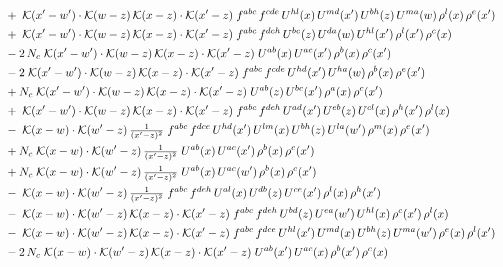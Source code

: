 \documentclass[10pt]{article}
\numberwithin{equation}{section}
\begin{document}
\begin{align}
&\quad +\;\mathcal{K}(x'-w')\cdot\mathcal{K}(w-z)\,\mathcal{K}(x-z)\cdot\mathcal{K}(x'-z)\;f^{abc}\,f^{cde}\,U^{hl}(x)\,U^{md}(x')\,U^{bh}(z)\,U^{ma}(w)\,\rho^{l}(x)\,\rho^{e}(x')\notag\\
&\quad +\;\mathcal{K}(x'-w')\cdot\mathcal{K}(w-z)\,\mathcal{K}(x-z)\cdot\mathcal{K}(x'-z)\;f^{abc}\,f^{deh}\,U^{be}(z)\,U^{da}(w)\,U^{hl}(x')\,\rho^{l}(x')\,\rho^{c}(x)\notag\\
&\quad -2\,N_c\;\mathcal{K}(x'-w')\cdot\mathcal{K}(w-z)\,\mathcal{K}(x-z)\cdot\mathcal{K}(x'-z)\;U^{ab}(x)\,U^{ac}(x')\,\rho^{b}(x)\,\rho^{c}(x')\notag\\
&\quad -2\;\mathcal{K}(x'-w')\cdot\mathcal{K}(w-z)\,\mathcal{K}(x-z)\cdot\mathcal{K}(x'-z)\;f^{abc}\,f^{cde}\,U^{hd}(x')\,U^{ha}(w)\,\rho^{b}(x)\,\rho^{e}(x')\notag\\
&\quad +N_c\;\mathcal{K}(x'-w')\cdot\mathcal{K}(w-z)\,\mathcal{K}(x-z)\cdot\mathcal{K}(x'-z)\;U^{ab}(z)\,U^{bc}(x')\,\rho^{a}(x)\,\rho^{c}(x')\notag\\
&\quad +\;\mathcal{K}(x'-w')\cdot\mathcal{K}(w-z)\,\mathcal{K}(x-z)\cdot\mathcal{K}(x'-z)\;f^{abc}\,f^{deh}\,U^{ad}(x')\,U^{eb}(z)\,U^{cl}(x)\,\rho^{h}(x')\,\rho^{l}(x)\notag\\
&\quad -\;\mathcal{K}(x-w)\cdot\mathcal{K}(w'-z)\,\tfrac{1}{(x'-z)^{2}}\;f^{abc}\,f^{dce}\,U^{hd}(x')\,U^{lm}(x)\,U^{bh}(z)\,U^{la}(w')\,\rho^{m}(x)\,\rho^{e}(x')\notag\\
&\quad +N_c\;\mathcal{K}(x-w)\cdot\mathcal{K}(w'-z)\,\tfrac{1}{(x'-z)^{2}}\;U^{ab}(x)\,U^{ac}(x')\,\rho^{b}(x)\,\rho^{c}(x')\notag\\
&\quad +N_c\;\mathcal{K}(x-w)\cdot\mathcal{K}(w'-z)\,\tfrac{1}{(x'-z)^{2}}\;U^{ab}(x)\,U^{ac}(w')\,\rho^{b}(x)\,\rho^{c}(x')\notag\\
&\quad -\;\mathcal{K}(x-w)\cdot\mathcal{K}(w'-z)\,\tfrac{1}{(x'-z)^{2}}\;f^{abc}\,f^{deh}\,U^{al}(x)\,U^{db}(z)\,U^{ce}(x')\,\rho^{l}(x)\,\rho^{h}(x')\notag\\
&\quad -\;\mathcal{K}(x-w)\cdot\mathcal{K}(w'-z)\,\mathcal{K}(x-z)\cdot\mathcal{K}(x'-z)\;f^{abc}\,f^{deh}\,U^{bd}(z)\,U^{ea}(w')\,U^{hl}(x)\,\rho^{c}(x')\,\rho^{l}(x)\notag\\
&\quad -\;\mathcal{K}(x-w)\cdot\mathcal{K}(w'-z)\,\mathcal{K}(x-z)\cdot\mathcal{K}(x'-z)\;f^{abc}\,f^{dce}\,U^{hl}(x')\,U^{md}(x)\,U^{bh}(z)\,U^{ma}(w')\,\rho^{e}(x)\,\rho^{l}(x')\notag\\
&\quad -2\,N_c\;\mathcal{K}(x-w)\cdot\mathcal{K}(w'-z)\,\mathcal{K}(x-z)\cdot\mathcal{K}(x'-z)\;U^{ab}(x')\,U^{ac}(x)\,\rho^{b}(x')\,\rho^{c}(x)\notag\\

\end{align}
\end{document}
